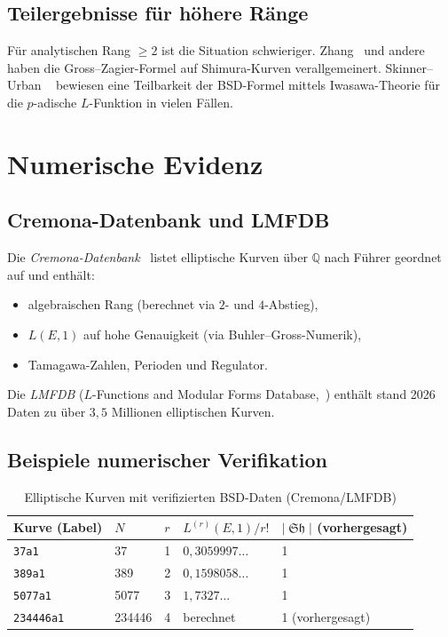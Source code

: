 \documentclass[12pt,a4paper]{article}
\theoremstyle{remark}
\DeclareMathOperator{\Sha}{\mathfrak{Sh}}
\begin{document}
\subsection{Teilergebnisse für höhere Ränge}

Für analytischen Rang $\geq 2$ ist die Situation schwieriger. Zhang~\cite{Zhang2001} und
andere haben die Gross--Zagier-Formel auf Shimura-Kurven verallgemeinert. Skinner--Urban
~\cite{SkinnerUrban2014} bewiesen eine Teilbarkeit der BSD-Formel mittels Iwasawa-Theorie
für die $p$-adische $L$-Funktion in vielen Fällen.

\section{Numerische Evidenz}

\subsection{Cremona-Datenbank und LMFDB}

Die \emph{Cremona-Datenbank}~\cite{Cremona2023} listet elliptische Kurven über $\mathbb{Q}$
nach Führer geordnet auf und enthält:
\begin{itemize}[nosep]
  \item algebraischen Rang (berechnet via $2$- und $4$-Abstieg),
  \item $L(E,1)$ auf hohe Genauigkeit (via Buhler--Gross-Numerik),
  \item Tamagawa-Zahlen, Perioden und Regulator.
\end{itemize}

Die \emph{LMFDB} ($L$-Functions and Modular Forms Database,~\cite{LMFDB}) enthält
stand 2026 Daten zu über $3{,}5$ Millionen elliptischen Kurven.

\subsection{Beispiele numerischer Verifikation}

\begin{table}[h]
\centering
\begin{tabular}{lllll}
\toprule
Kurve (Label) & $N$ & $r$ & $L^{(r)}(E,1)/r!$ & $|\Sha|$ (vorhergesagt) \\
\midrule
\texttt{37a1}     & 37     & 1 & $0{,}3059997\ldots$ & 1 \\
\texttt{389a1}    & 389    & 2 & $0{,}1598058\ldots$ & 1 \\
\texttt{5077a1}   & 5077   & 3 & $1{,}7327\ldots$    & 1 \\
\texttt{234446a1} & 234446 & 4 & berechnet           & 1 (vorhergesagt) \\
\bottomrule
\end{tabular}
\caption{Elliptische Kurven mit verifizierten BSD-Daten (Cremona/LMFDB)}
\end{table}
\end{document}
